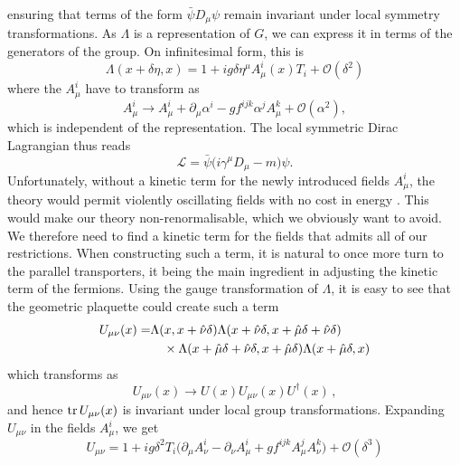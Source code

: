 %
ensuring that terms of the form $\bar{\psi} D_{\mu} \psi$ remain invariant under
local symmetry transformations. As $\Lambda$ is a representation of $G$, we can
express it in terms of the generators of the group. On infinitesimal
form, this is
%
\begin{equation}
  \Lambda(x + \delta\eta,x) = 1 + i g \delta \eta^{\mu} A^i_{\mu}(x) T_i +
    \mathcal{O}(\delta^2)
\end{equation}
%
where the $A^i_{\mu}$ have to transform as
%
\begin{equation}
  A^i_{\mu} \to A^i_{\mu} + \partial_{\mu} \alpha^i - g f^{ijk} \alpha^j A^k_{\mu}
    + \mathcal{O}(\alpha^2),
\end{equation}
%
which is independent of the representation. The local symmetric Dirac
Lagrangian thus reads
%
\begin{equation}
  \mathcal{L} = \bar{\psi}\big(i \gamma^{\mu} D_{\mu} - m\big) \psi.
\end{equation}
%
Unfortunately, without a kinetic term for the newly introduced fields
$A^i_{\mu}$, the theory would permit violently oscillating fields with no cost
in energy \citep{tHooft:2002zz}. This would make our theory non-renormalisable,
which we obviously want to avoid.  We therefore need to find a kinetic term for
the fields that admits all of our restrictions. When constructing such a term,
it is natural to once more turn to the parallel transporters, it being the main
ingredient in adjusting the kinetic term of the fermions. Using the gauge
transformation of $\Lambda$, it is easy to see that the geometric plaquette
could create such a term
%
\begin{align} \label{eq:transport_plaquette}
  U_{\mu\nu}(x) =& \Lambda(x, x + \hat{\nu} \delta)
    \Lambda(x + \hat{\nu} \delta, x + \hat{\mu} \delta + \hat{\nu} \delta) \nonumber\\
    &\hskip1em\times\Lambda(x + \hat{\mu} \delta + \hat{\nu}\delta, x + \hat{\mu} \delta)
    \Lambda(x + \hat{\mu}\delta, x)
\end{align}
%
which transforms as
%
\begin{equation}
  U_{\mu\nu}(x) \to U(x) U_{\mu\nu}(x) U^{\dagger}(x) \,,
\end{equation}
%
and hence $\operatorname{tr} U_{\mu\nu}(x)$ is invariant under local group
transformations. Expanding $U_{\mu\nu}$ in the fields $A^i_{\mu}$, we get
%
\begin{equation}
  U_{\mu\nu} = 1 + i g \delta^2 T_i \big( \partial_{\mu} A^i_{\nu} - \partial_{\nu}
  A^i_{\mu} + g f^{ijk} A^j_{\mu} A^k_{\nu} \big) + \mathcal{O}(\delta^3)
\end{equation}
